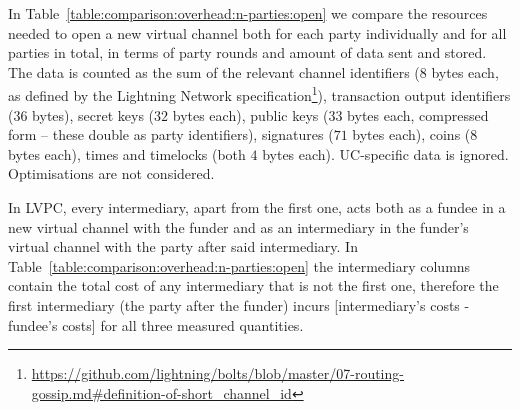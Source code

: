   In Table~\ref{table:comparison:overhead:n-parties:open} we compare the
  resources needed to open a new virtual channel both for each party
  individually and for all parties in total, in terms of party rounds and amount
  of data sent and stored. The data is counted as the sum of the relevant
  channel identifiers ($8$ bytes each, as defined by the Lightning Network
  specification\footnote{\url{https://github.com/lightning/bolts/blob/master/07-routing-gossip.md\#definition-of-short_channel_id}}),
  transaction output identifiers ($36$ bytes), secret keys ($32$ bytes each),
  public keys ($33$ bytes each, compressed form -- these double as party
  identifiers), signatures ($71$ bytes each), coins ($8$ bytes each), times and
  timelocks (both $4$ bytes each). UC-specific data is ignored.   Optimisations are not
  considered.

  In LVPC, every intermediary, apart from the first one, acts both as a fundee
  in a new virtual channel with the funder and as an intermediary in the
  funder's virtual channel with the party after said intermediary. In
  Table~\ref{table:comparison:overhead:n-parties:open} the intermediary columns
  contain the total cost of any intermediary that is not the first one,
  therefore the first intermediary (the party after the funder) incurs
  [intermediary's costs - fundee's costs] for all three measured quantities.

